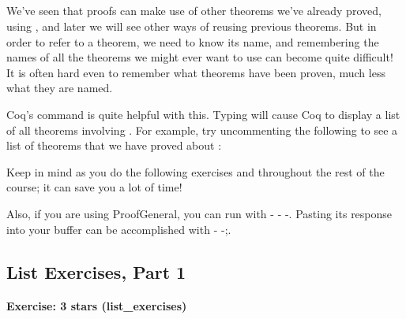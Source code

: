\documentclass[12pt]{report}
\begin{document}
\subsection{\texorpdfstring{\protect{}}{SearchAbout}}



 We've seen that proofs can make use of other theorems we've
    already proved, using , and later we will see other ways
    of reusing previous theorems.  But in order to refer to a theorem,
    we need to know its name, and remembering the names of all the
    theorems we might ever want to use can become quite difficult!  It
    is often hard even to remember what theorems have been proven,
    much less what they are named.


    Coq's  command is quite helpful with this.  Typing
      will cause Coq to display a list of all theorems
    involving .  For example, try uncommenting the following to
    see a list of theorems that we have proved about : \begin{coqdoccode}
\coqdocemptyline
\coqdocemptyline
\end{coqdoccode}
Keep  in mind as you do the following exercises and
    throughout the rest of the course; it can save you a lot of time! 

 Also, if you are using ProofGeneral, you can run 
    with - - -. Pasting its response into your buffer can be
    accomplished with - -;. \begin{coqdoccode}
\coqdocemptyline
\end{coqdoccode}
\subsection{List Exercises, Part 1}



\paragraph{Exercise: 3 stars (list\_exercises)}
\end{document}
